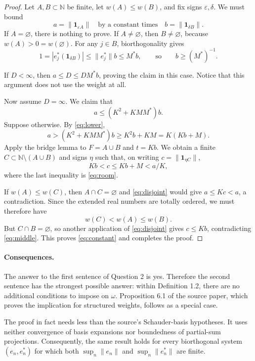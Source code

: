 \documentclass[11pt]{article}
\newcommand{\N}{\mathbb N}
\newcommand{\one}{\mathbf 1}
\begin{document}
\begin{proof}
Let \(A,B\subset\N\) be finite, let \(w(A)\le w(B)\), and fix signs
\(\varepsilon,\delta\). We must bound
\[
 a=\|\one_{\varepsilon A}\|
 \quad\text{by a constant times}\quad
 b=\|\one_{\delta B}\|.
\]
If \(A=\varnothing\), there is nothing to prove. If \(A\ne\varnothing\),
then \(B\ne\varnothing\), because \(w(A)>0=w(\varnothing)\). For any
\(j\in B\), biorthogonality gives
\[
 1=|e_j^*(\one_{\delta B})|
 \le \|e_j^*\|b\le M^*b,
 \qquad\text{so}\qquad b\ge (M^*)^{-1}.
 \tag{5}\label{eq:lower}
\]

If \(D<\infty\), then \(a\le D\le DM^*b\), proving the claim in this
case. Notice that this argument does not use the weight at all.

Now assume \(D=\infty\). We claim that
\[
 a\le (K^2+KMM^*)b.
\]
Suppose otherwise. By \eqref{eq:lower},
\[
 a>(K^2+KMM^*)b
   \ge K^2b+KM
   =K(Kb+M).
 \tag{6}\label{eq:room}
\]
Apply the bridge lemma to \(F=A\cup B\) and \(t=Kb\). We obtain a finite
\(C\subset\N\setminus(A\cup B)\) and signs \(\eta\) such that, on writing
\(c=\|\one_{\eta C}\|\),
\[
 Kb<c\le Kb+M<a/K,
 \tag{7}\label{eq:middle}
\]
where the last inequality is \eqref{eq:room}.

If \(w(A)\le w(C)\), then \(A\cap C=\varnothing\) and
\eqref{eq:disjoint} would give \(a\le Kc<a\), a contradiction. Since the
extended real numbers are totally ordered, we must therefore have
\[
 w(C)<w(A)\le w(B).
\]
But \(C\cap B=\varnothing\), so another application of
\eqref{eq:disjoint} gives \(c\le Kb\), contradicting
\eqref{eq:middle}. This proves \eqref{eq:constant} and completes the proof.
\end{proof}

\paragraph{Consequences.}
The answer to the first sentence of Question 2 is yes. Therefore the second
sentence has the strongest possible answer: within Definition 1.2, there are
no additional conditions to impose on \(\omega\). Proposition 6.1 of the
source paper, which proves the implication for structured weights, follows
as a special case.

The proof in fact needs less than the source's Schauder-basis hypotheses. It
uses neither convergence of basis expansions nor boundedness of partial-sum
projections. Consequently, the same result holds for every biorthogonal system
\((e_n,e_n^*)\) for which both \(\sup_n\|e_n\|\) and
\(\sup_n\|e_n^*\|\) are finite.
\end{document}

